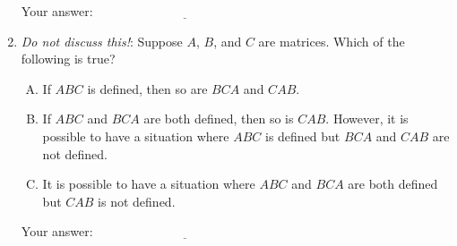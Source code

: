 \documentclass[10pt]{amsart}
\begin{document}
\begin{enumerate}
  \vspace{0.1in}
  Your answer: $\underline{\qquad\qquad\qquad\qquad\qquad\qquad\qquad}$
  \vspace{0.1in}

\item {\em Do not discuss this!}: Suppose $A$, $B$, and $C$ are
  matrices. Which of the following is true?

  \begin{enumerate}[(A)]
  \item If $ABC$ is defined, then so are $BCA$ and $CAB$.
  \item If $ABC$ and $BCA$ are both defined, then so is
    $CAB$. However, it is possible to have a situation where $ABC$ is
    defined but $BCA$ and $CAB$ are not defined.
  \item It is possible to have a situation where $ABC$ and $BCA$ are
    both defined but $CAB$ is not defined.
  \end{enumerate}

  \vspace{0.1in}
  Your answer: $\underline{\qquad\qquad\qquad\qquad\qquad\qquad\qquad}$
  \vspace{0.1in}

\end{enumerate}
\end{document}
